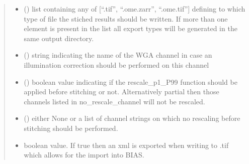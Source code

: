 \documentclass[a4paper,10pt,english,openany,oneside]{sphinxmanual}
\begin{document}
\begin{fulllineitems}
\begin{quote}
\begin{description}
\begin{itemize}
\item {} 
\sphinxAtStartPar
{} (\sphinxstyleliteralemphasis{\sphinxupquote{{[}}}\sphinxstyleliteralemphasis{\sphinxupquote{{]}}}) \textendash{} list containing any of {[}“.tif”, “.ome.zarr”, “.ome.tif”{]} defining to which type of file the stiched results should be written. If more than one
element is present in the list all export types will be generated in the same output directory.

\item {} 
\sphinxAtStartPar
{} () \textendash{} string indicating the name of the WGA channel in case an illumination correction should be performed on this channel

\item {} 
\sphinxAtStartPar
{} () \textendash{} boolean value indicating if the rescale\_p1\_P99 function should be applied before stitching or not. Alternatively partial then those channels listed in no\_rescale\_channel will
not be rescaled.

\item {} 
\sphinxAtStartPar
{} (\sphinxstyleliteralemphasis{\sphinxupquote{ | }}\sphinxstyleliteralemphasis{\sphinxupquote{{[}}}\sphinxstyleliteralemphasis{\sphinxupquote{{]}}}) \textendash{} either None or a list of channel strings on which no rescaling before stitching should be performed.

\item {} 
\sphinxAtStartPar
{} \textendash{} boolean value. If true then an xml is exported when writing to .tif which allows for the import into BIAS.

\end{itemize}

\end{description}\end{quote}

\end{fulllineitems}

\end{document}
